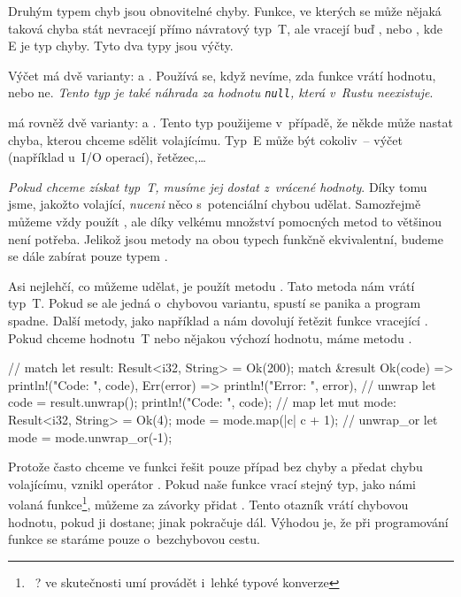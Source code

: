 \documentclass[main.tex]{subfiles}
\begin{document}

Druhým typem chyb jsou obnovitelné chyby. Funkce, ve kterých se může nějaká taková chyba
stát nevracejí přímo návratový typ~T, ale vracejí buď , nebo
, kde E je typ chyby. Tyto dva typy jsou výčty.
\cite[sekce\,9.2]{thebook}

Výčet  má dvě varianty:  a . Používá se, když
nevíme, zda funkce vrátí hodnotu, nebo ne. \emph{Tento typ je také náhrada za hodnotu
    \texttt{null}, která v~Rustu neexistuje}.

 má rovněž dvě varianty:  a . Tento typ
použijeme v~případě, že někde může nastat chyba, kterou chceme sdělit volajícímu. Typ~E
může být cokoliv~-- výčet (například u~I/O operací), řetězec,\dots


\emph{Pokud chceme získat typ~T, musíme jej dostat z~vrácené hodnoty}. Díky tomu jsme,
jakožto volající, \emph{nuceni} něco s~potenciální chybou udělat. Samozřejmě můžeme vždy
použít , ale díky velkému množství pomocných metod to většinou není potřeba.
Jelikož jsou metody na obou typech funkčně ekvivalentní, budeme se dále zabírat pouze
typem .

Asi nejlehčí, co můžeme udělat, je použít metodu . Tato metoda nám vrátí
typ~T. Pokud se ale jedná o~chybovou variantu, spustí se panika a program spadne. Další
metody, jako například  a  nám dovolují řetězit funkce
vracející . Pokud chceme hodnotu~T nebo nějakou výchozí hodnotu,
máme metodu . \cite[result]{ruststd}

\obrazek
\begin{rustcode}
    // match
    let result: Result<i32, String> = Ok(200);
    match &result {
        Ok(code) => println!("Code: {}", code),
        Err(error) => println!("Error: {}", error),
    }
    // unwrap
    let code = result.unwrap();
    println!("Code: {}", code);
    // map
    let mut mode: Result<i32, String> = Ok(4);
    mode = mode.map(|c| c + 1);
    // unwrap\_or
    let mode = mode.unwrap_or(-1);
\end{rustcode}


Protože často chceme ve funkci řešit pouze případ bez chyby a předat chybu volajícímu,
vznikl operátor . Pokud naše funkce vrací stejný typ, jako námi volaná
funkce\footnote{~? ve skutečnosti umí provádět i~lehké typové konverze}, můžeme za
závorky přidat . Tento otazník vrátí chybovou hodnotu, pokud ji dostane; jinak
pokračuje dál. Výhodou je, že při programování funkce se staráme pouze o~bezchybovou
cestu. \cite[sekce\,9.2]{thebook}
\end{document}
